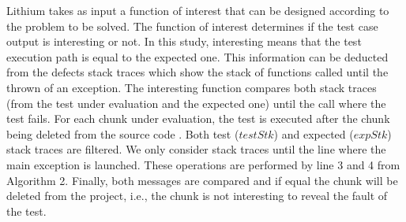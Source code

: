 \documentclass{article}
\begin{document}
%
%
%
%
%

Lithium takes as input a function of interest that can be designed according to the problem to be solved. The function of interest determines if the test case output is interesting or not. In this study, interesting means that the test execution path is equal to the expected one. This information can be deducted from the defects stack traces which show the stack of functions called until the thrown of an exception. The interesting function compares both stack traces (from the test under evaluation and the expected one) until the call where the test fails. For each chunk under evaluation, the test is executed after the chunk being deleted from the source code . Both test ($testStk$) and expected ($expStk$) stack traces are filtered. We only consider stack traces until the line where the main exception is launched. These operations are performed by line 3 and 4 from Algorithm 2. Finally, both messages are compared and if equal the chunk will be deleted from the project, i.e., the chunk is not interesting to reveal the fault of the test.
\end{document}
